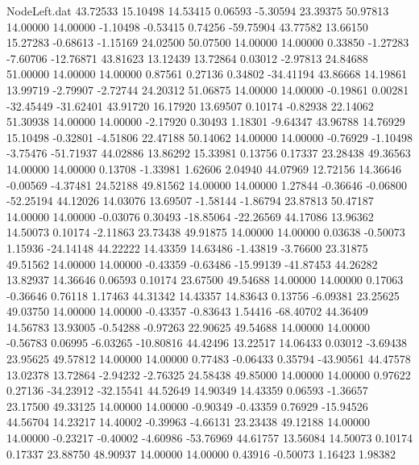 \begin{filecontents}{NodeLeft.dat}
  43.72533   15.10498   14.53415     0.06593   -5.30594   23.39375   50.97813   14.00000   14.00000   -1.10498   -0.53415    0.74256  -59.75904
  43.77582   13.66150   15.27283    -0.68613   -1.15169   24.02500   50.07500   14.00000   14.00000    0.33850   -1.27283   -7.60706  -12.76871
  43.81623   13.12439   13.72864     0.03012   -2.97813   24.84688   51.00000   14.00000   14.00000    0.87561    0.27136    0.34802  -34.41194
  43.86668   14.19861   13.99719    -2.79907   -2.72744   24.20312   51.06875   14.00000   14.00000   -0.19861    0.00281  -32.45449  -31.62401
  43.91720   16.17920   13.69507     0.10174   -0.82938   22.14062   51.30938   14.00000   14.00000   -2.17920    0.30493    1.18301   -9.64347
  43.96788   14.76929   15.10498    -0.32801   -4.51806   22.47188   50.14062   14.00000   14.00000   -0.76929   -1.10498   -3.75476  -51.71937
  44.02886   13.86292   15.33981     0.13756    0.17337   23.28438   49.36563   14.00000   14.00000    0.13708   -1.33981    1.62606    2.04940
  44.07969   12.72156   14.36646    -0.00569   -4.37481   24.52188   49.81562   14.00000   14.00000    1.27844   -0.36646   -0.06800  -52.25194
  44.12026   14.03076   13.69507    -1.58144   -1.86794   23.87813   50.47187   14.00000   14.00000   -0.03076    0.30493  -18.85064  -22.26569
  44.17086   13.96362   14.50073     0.10174   -2.11863   23.73438   49.91875   14.00000   14.00000    0.03638   -0.50073    1.15936  -24.14148
  44.22222   14.43359   14.63486    -1.43819   -3.76600   23.31875   49.51562   14.00000   14.00000   -0.43359   -0.63486  -15.99139  -41.87453
  44.26282   13.82937   14.36646     0.06593    0.10174   23.67500   49.54688   14.00000   14.00000    0.17063   -0.36646    0.76118    1.17463
  44.31342   14.43357   14.83643     0.13756   -6.09381   23.25625   49.03750   14.00000   14.00000   -0.43357   -0.83643    1.54416  -68.40702
  44.36409   14.56783   13.93005    -0.54288   -0.97263   22.90625   49.54688   14.00000   14.00000   -0.56783    0.06995   -6.03265  -10.80816
  44.42496   13.22517   14.06433     0.03012   -3.69438   23.95625   49.57812   14.00000   14.00000    0.77483   -0.06433    0.35794  -43.90561
  44.47578   13.02378   13.72864    -2.94232   -2.76325   24.58438   49.85000   14.00000   14.00000    0.97622    0.27136  -34.23912  -32.15541
  44.52649   14.90349   14.43359     0.06593   -1.36657   23.17500   49.33125   14.00000   14.00000   -0.90349   -0.43359    0.76929  -15.94526
  44.56704   14.23217   14.40002    -0.39963   -4.66131   23.23438   49.12188   14.00000   14.00000   -0.23217   -0.40002   -4.60986  -53.76969
  44.61757   13.56084   14.50073     0.10174    0.17337   23.88750   48.90937   14.00000   14.00000    0.43916   -0.50073    1.16423    1.98382

\end{filecontents}
